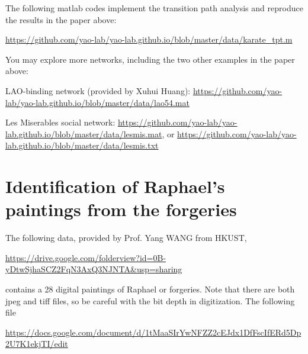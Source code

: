 \documentclass[11pt]{article}
\begin{document}
The following matlab codes implement the transition path analysis and reproduce the results in the paper above:

\url{https://github.com/yao-lab/yao-lab.github.io/blob/master/data/karate_tpt.m}

You may explore more networks, including the two other examples in the paper above:

LAO-binding network (provided by Xuhui Huang): \url{https://github.com/yao-lab/yao-lab.github.io/blob/master/data/lao54.mat}

Les Miserables social network: \url{https://github.com/yao-lab/yao-lab.github.io/blob/master/data/lesmis.mat}, or \url{https://github.com/yao-lab/yao-lab.github.io/blob/master/data/lesmis.txt}



\section{Identification of Raphael's paintings from the forgeries}

The following data, provided by Prof. Yang WANG from HKUST,

\url{https://drive.google.com/folderview?id=0B-yDtwSjhaSCZ2FqN3AxQ3NJNTA&usp=sharing}

\noindent contains a 28 digital paintings of Raphael or forgeries. Note that there are both jpeg and tiff files, so be careful with the bit depth in digitization. The following file

\url{https://docs.google.com/document/d/1tMaaSIrYwNFZZ2cEJdx1DfFscIfERd5Dp2U7K1ekjTI/edit}
\end{document}
